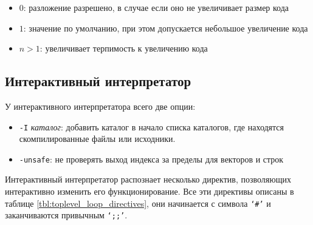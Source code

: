 \begin{itemize}
	\item $0$: разложение разрешено, в случае если оно не увеличивает размер
кода
	\item $1$: значение по умолчанию, при этом допускается небольшое увеличение
кода
	\item $n > 1$: увеличивает терпимость к увеличению кода
\end{itemize}

\subsection{Интерактивный интерпретатор}

У интерактивного интерпретатора всего две опции:

\begin{itemize}
	\item \texttt{-I} {\it каталог}: добавить каталог в начало списка каталогов,
где находятся
скомпилированные файлы или исходники.
	\item \texttt{-unsafe}: не проверять выход индекса за пределы для векторов и
строк
\end{itemize}

Интерактивный интерпретатор распознает несколько директив, позволяющих
интерактивно изменить его функционирование. Все эти директивы описаны в таблице
\ref{tbl:toplevel_loop_directives}, они начинается с символа \texttt{`\#'} и
заканчиваются привычным \texttt{`;;'}.

